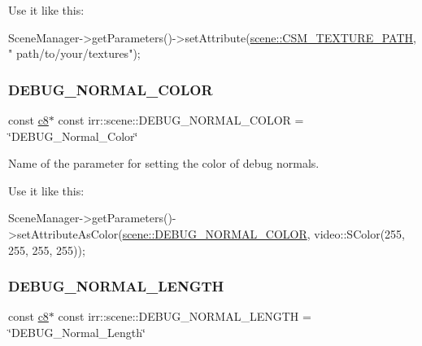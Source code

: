Use it like this\+: 
\begin{DoxyCode}
SceneManager->getParameters()->setAttribute(\hyperlink{namespaceirr_1_1scene_aecf002b9e14bd101b455632e1c260a8d}{scene::CSM\_TEXTURE\_PATH}, \textcolor{stringliteral}{"
      path/to/your/textures"});
\end{DoxyCode}
 \mbox{\label{namespaceirr_1_1scene_a767a12984dbf7a4f0917993d748d1350}} 
\subsubsection{\texorpdfstring{D\+E\+B\+U\+G\+\_\+\+N\+O\+R\+M\+A\+L\+\_\+\+C\+O\+L\+OR}{DEBUG\_NORMAL\_COLOR}}
{\footnotesize\ttfamily const \hyperlink{namespaceirr_a9395eaea339bcb546b319e9c96bf7410}{c8}$\ast$ const irr\+::scene\+::\+D\+E\+B\+U\+G\+\_\+\+N\+O\+R\+M\+A\+L\+\_\+\+C\+O\+L\+OR = \char`\"{}D\+E\+B\+U\+G\+\_\+\+Normal\+\_\+\+Color\char`\"{}}



Name of the parameter for setting the color of debug normals. 

Use it like this\+: 
\begin{DoxyCode}
SceneManager->getParameters()->setAttributeAsColor(\hyperlink{namespaceirr_1_1scene_a767a12984dbf7a4f0917993d748d1350}{scene::DEBUG\_NORMAL\_COLOR}, 
      video::SColor(255, 255, 255, 255));
\end{DoxyCode}
 \mbox{\label{namespaceirr_1_1scene_a19153395855d08302b70dcfa9247eb51}} 
\subsubsection{\texorpdfstring{D\+E\+B\+U\+G\+\_\+\+N\+O\+R\+M\+A\+L\+\_\+\+L\+E\+N\+G\+TH}{DEBUG\_NORMAL\_LENGTH}}
{\footnotesize\ttfamily const \hyperlink{namespaceirr_a9395eaea339bcb546b319e9c96bf7410}{c8}$\ast$ const irr\+::scene\+::\+D\+E\+B\+U\+G\+\_\+\+N\+O\+R\+M\+A\+L\+\_\+\+L\+E\+N\+G\+TH = \char`\"{}D\+E\+B\+U\+G\+\_\+\+Normal\+\_\+\+Length\char`\"{}}



